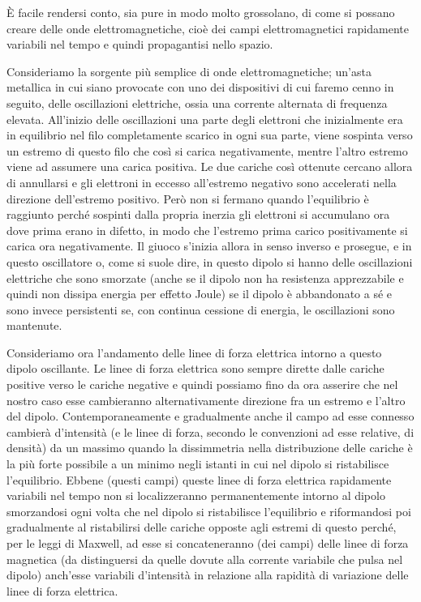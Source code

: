 \documentclass[a4paper]{article}
\begin{document}
È facile rendersi conto, sia pure in modo molto grossolano, di come si possano creare delle onde elettromagnetiche, cioè dei campi elettromagnetici rapidamente variabili nel tempo e quindi propagantisi nello spazio.

Consideriamo la sorgente più semplice di onde elettromagnetiche; un'asta metallica in cui siano provocate con uno dei dispositivi di cui faremo cenno in seguito, delle oscillazioni elettriche, ossia una corrente alternata di frequenza elevata. All'inizio delle oscillazioni una parte degli elettroni che inizialmente era in equilibrio nel filo completamente scarico in ogni sua parte, viene sospinta verso un estremo di questo filo che così si carica negativamente, mentre l'altro estremo viene ad assumere una carica positiva. Le due cariche così ottenute cercano allora di annullarsi e gli elettroni in eccesso all'estremo negativo sono accelerati nella direzione dell'estremo positivo. Però non si fermano quando l'equilibrio è raggiunto perché sospinti dalla propria inerzia gli elettroni si accumulano ora dove prima erano in difetto, in modo che l'estremo prima carico positivamente si carica ora negativamente. Il giuoco s'inizia allora in senso inverso e prosegue, e in questo oscillatore o, come si suole dire, in questo dipolo si hanno delle oscillazioni elettriche che sono smorzate (anche se il dipolo non ha resistenza apprezzabile e quindi non dissipa energia per effetto Joule) se il dipolo è abbandonato a sé e sono invece persistenti se, con continua cessione di energia, le oscillazioni sono mantenute.

Consideriamo ora l'andamento delle linee di forza elettrica intorno a questo dipolo oscillante. Le linee di forza elettrica sono sempre dirette dalle cariche positive verso le cariche negative e quindi possiamo fino da ora asserire che nel nostro caso esse cambieranno alternativamente direzione fra un estremo e l'altro del dipolo. Contemporaneamente e gradualmente anche il campo ad esse connesso cambierà d'intensità (e le linee di forza, secondo le convenzioni ad esse relative, di densità) da un massimo quando la dissimmetria nella distribuzione delle cariche è la più forte possibile a un minimo negli istanti in cui nel dipolo si ristabilisce l'equilibrio. Ebbene (questi campi) queste linee di forza elettrica rapidamente variabili nel tempo non si localizzeranno permanentemente intorno al dipolo smorzandosi ogni volta che nel dipolo si ristabilisce l'equilibrio e riformandosi poi gradualmente al ristabilirsi delle cariche opposte agli estremi di questo perché, per le leggi di Maxwell, ad esse si concateneranno (dei campi) delle linee di forza magnetica (da distinguersi da quelle dovute alla corrente variabile che pulsa nel dipolo) anch'esse variabili d'intensità in relazione alla rapidità di variazione delle linee di forza elettrica.
\end{document}
